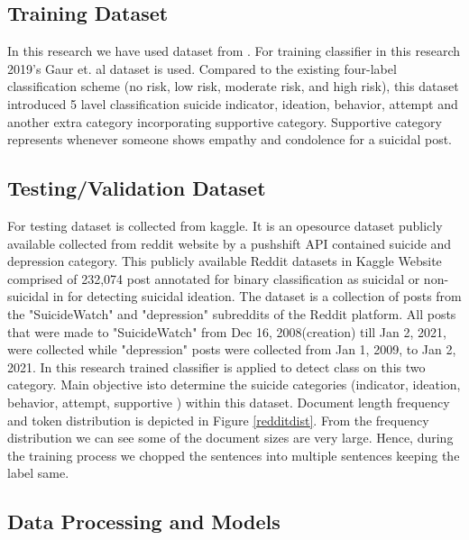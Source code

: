 \documentclass[sn-mathphys,Numbered]{sn-jnl}%
\theoremstyle{thmstyleone}%
\theoremstyle{thmstyletwo}%
\theoremstyle{thmstylethree}%
\begin{document}
\subsection{Training Dataset}
In this research we have used dataset from \cite{gaur2019knowledge}. For training classifier in this research 2019's Gaur et. al \cite{gaur2019knowledge} dataset is used. Compared to the existing four-label classification scheme (no risk, low risk, moderate risk, and high risk), this dataset introduced 5 lavel classification suicide indicator, ideation, behavior, attempt and another extra category incorporating supportive category. Supportive category represents whenever someone shows empathy and condolence for a suicidal post. 

\subsection{Testing/Validation Dataset} 
For testing dataset is collected from kaggle. It is an opesource dataset publicly available collected from reddit website by a pushshift API contained suicide and depression category.  This publicly available Reddit datasets in Kaggle Website comprised of 232,074 post annotated for binary classification as suicidal or non-suicidal in \cite{aldhyani2022detecting} for detecting suicidal ideation. The dataset is a collection of posts from the "SuicideWatch" and "depression" subreddits of the Reddit platform. All posts that were made to "SuicideWatch" from Dec 16, 2008(creation) till Jan 2, 2021, were collected while "depression" posts were collected from Jan 1, 2009, to Jan 2, 2021. In this research trained classifier is applied to detect class on this two category. Main objective isto determine the suicide categories (indicator, ideation, behavior, attempt, supportive ) within this dataset. Document length frequency and token distribution is depicted in Figure \ref{redditdist}. From the frequency distribution we can see some of the document sizes are very large. Hence, during the training process we chopped the sentences into multiple sentences keeping the label same. 

\subsection{Data Processing and Models}
\end{document}
